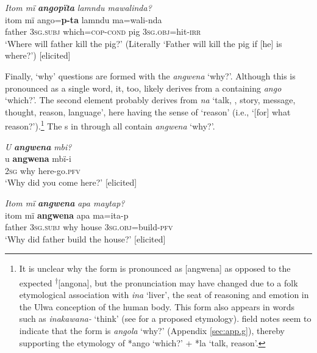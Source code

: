 \ea%
    \label{ex:syntax:55}
          \textit{Itom mï} \textbf{\textit{angopïta}} \textit{lamndu mawalinda?}\\
\gll    itom  mï      ango=\textbf{p-ta}      lamndu  ma=wali-nda\\
    father  \textsc{3sg.subj}  which=\textsc{cop}{}-\textsc{cond}  pig      \textsc{3sg.obj}=hit-\textsc{irr}\\
\glt `Where will father kill the pig?’ (Literally ‘Father will kill the pig if [he] is where?’) [elicited]
\z

Finally, ‘why’ questions are formed with the  \textit{angwena} ‘why?’. Although this is pronounced as a single word, it, too, likely derives from a  containing \textit{ango} ‘which?’. The second element probably derives from \textit{na} ‘talk, , story, message, thought, reason, language’, here having the sense of ‘reason’ (i.e., ‘[for] what reason?’).\footnote{It is unclear why the form is pronounced as [angwena] as opposed to the expected \textsuperscript{†}[angona], but the pronunciation may have changed due to a folk etymological association with \textit{ina} ‘liver’, the seat of reasoning and emotion in the Ulwa conception of the human body. This form also appears in words such as \textit{inakawana-} ‘think’ (see  for a proposed etymology).  field notes seem to indicate that the   form is \textit{angola} ‘why?’ (Appendix \ref{sec:app.g}), thereby supporting the etymology of *ango ‘which?’ + *la ‘talk, reason’.} The s in  through  all contain \textit{angwena} ‘why?’.


\ea%
    \label{ex:syntax:56}
          \textit{U} \textbf{\textit{angwena}} \textit{mbi?}\\
\gll    u    \textbf{angwena}  mbï-i\\
    \textsc{2sg}  why    here-go.\textsc{pfv}\\
\glt `Why did you come here?’ [elicited]
\z

\ea%
    \label{ex:syntax:57}
          \textit{Itom mï} \textbf{\textit{angwena}} \textit{apa maytap?}\\
\gll    itom  mï      \textbf{angwena}  apa    ma=ita-p\\
    father  3\textsc{sg.subj}  why    house  3\textsc{sg.obj}=build-\textsc{pfv}\\
\glt `Why did father build the house?’ [elicited]
\z

